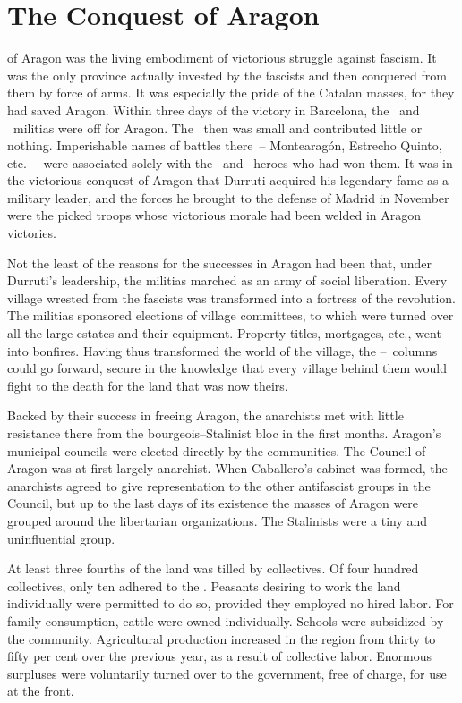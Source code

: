 \chapter{The Conquest of Aragon}

 of Aragon was the living embodiment of victorious struggle against fascism\kn. It was the only province actually invested by the fascists and then conquered from them by force of arms. It was especially the pride of the Catalan masses, for they had saved Aragon. Within three days of the victory in Barcelona, the \CNT\ and \POUM\ militias were off for Aragon. The \PSUC\ then was small and contributed little or nothing. Imperishable names of battles there~-- Montearagón, Estrecho Quinto, etc.~-- were associated solely with the \CNT\ and \POUM\ heroes who had won them. It was in the victorious conquest of Aragon that Durruti acquired his legendary fame as a military leader, and the forces he brought to the defense of Madrid in November were the picked troops whose victorious morale had been welded in Aragon victories.

Not the least of the reasons for the successes in Aragon had been that, under Durruti’s leadership, the militias marched as an army of social liberation. Every village wrested from the fascists was transformed into a fortress of the revolution. The militias sponsored elections of village committees, to which were turned over all the large estates and their equipment. Property titles, mortgages, etc., went into bonfires. Having thus transformed the world of the village, the \CNT--\POUM\ columns could go forward, secure in the knowledge that every village behind them would fight to the death for the land that was now theirs.

Backed by their success in freeing Aragon, the anarchists met with little resistance there from the bourgeois--Stalinist bloc in the first months. Aragon’s municipal councils were elected directly by the communities. The Council of Aragon was at first largely anarchist. When Caballero’s cabinet was formed, the anarchists agreed to give representation to the other antifascist groups in the Council, but up to the last days of its existence the masses of Aragon were grouped around the libertarian organizations. The Stalinists were a tiny and uninfluential group.

At least three fourths of the land was tilled by collectives. Of four hundred collectives, only ten adhered to the \UGT\kn. Peasants desiring to work the land individually were permitted to do so, provided they employed no hired labor. For family consumption, cattle were owned individually. Schools were subsidized by the community. Agricultural production increased in the region from thirty to fifty per cent over the previous year, as a result of collective labor. Enormous surpluses were voluntarily turned over to the government, free of charge, for use at the front.

